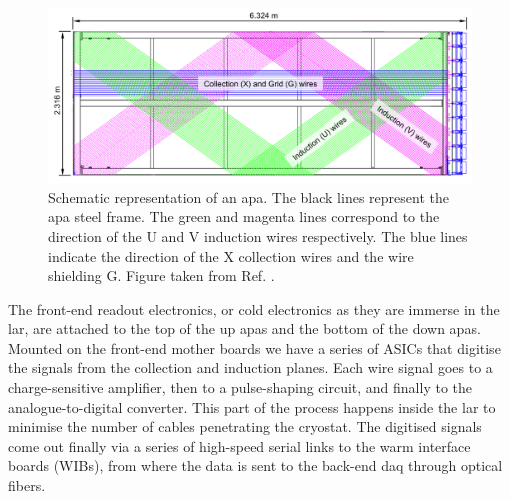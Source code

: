 \begin{figure}[t]
	\centering
	\includegraphics[width=1\linewidth]{Images/DUNE/FD/APA_wires}
	\caption[Schematic representation of an \gls{apa} frames showing the U, V, X and G wires.]{Schematic representation of an \gls{apa}. The black lines represent the \gls{apa} steel frame. The green and magenta lines correspond to the direction of the U and V induction wires respectively. The blue lines indicate the direction of the X collection wires and the wire shielding G. Figure taken from Ref. \cite{DUNE2020TDR1}.}
	\label{fig:apa}
\end{figure}

The front-end readout electronics, or cold electronics as they are immerse in the \gls{lar}, are attached to the top of the up \gls{apa}s and the bottom of the down \gls{apa}s. Mounted on the front-end mother boards we have a series of ASICs that digitise the signals from the collection and induction planes. Each wire signal goes to a charge-sensitive amplifier, then to a pulse-shaping circuit, and finally to the analogue-to-digital converter. This part of the process happens inside the \gls{lar} to minimise the number of cables penetrating the cryostat. The digitised signals come out finally via a series of high-speed serial links to the warm interface boards (WIBs), from where the data is sent to the back-end \gls{daq} through optical fibers.

